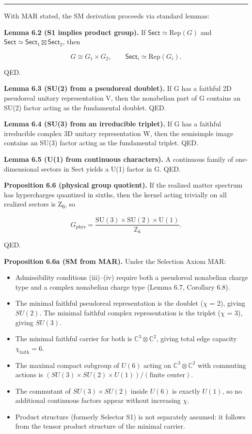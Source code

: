 \documentclass[11pt,a4paper]{article}
\theoremstyle{remark}
\providecommand{\tightlist}{%
  \setlength{\itemsep}{0pt}\setlength{\parskip}{0pt}}
\begin{document}
\begin{center}\rule{0.5\linewidth}{0.5pt}\end{center}

With MAR stated, the SM derivation proceeds via standard lemmas:

\textbf{Lemma 6.2 (S1 implies product group).} If
\(\mathsf{Sect} \simeq \mathrm{Rep}(G)\) and
\(\mathsf{Sect} \simeq \mathsf{Sect}_1 \boxtimes \mathsf{Sect}_2\),
then

\[
G \cong G_1 \times G_2,
\qquad
\mathsf{Sect}_i \simeq \mathrm{Rep}(G_i).
\]

QED.

\textbf{Lemma 6.3 (SU(2) from a pseudoreal doublet).} If G has a faithful
2D pseudoreal unitary representation V, then the nonabelian part of G
contains an SU(2) factor acting as the fundamental doublet. QED.

\textbf{Lemma 6.4 (SU(3) from an irreducible triplet).} If G has a faithful
irreducible complex 3D unitary representation W, then the semisimple image
contains an SU(3) factor acting as the fundamental triplet. QED.

\textbf{Lemma 6.5 (U(1) from continuous characters).} A continuous family of
one-dimensional sectors in Sect yields a U(1) factor in G. QED.

\textbf{Proposition 6.6 (physical group quotient).} If the realized matter
spectrum has hypercharges quantized in sixths, then the kernel acting
trivially on all realized sectors is Z\textsubscript{6}, so

\[
G_{\mathrm{phys}} = \frac{\mathrm{SU}(3)\times \mathrm{SU}(2)\times \mathrm{U}(1)}{\mathbb Z_6}.
\]

QED.

\textbf{Proposition 6.6a (SM from MAR).} Under the Selection Axiom MAR:

\begin{itemize}
\tightlist
\item
  Admissibility conditions (iii)--(iv) require both a pseudoreal nonabelian
  charge type and a complex nonabelian charge type (Lemma 6.7, Corollary 6.8).
\item
  The minimal faithful pseudoreal representation is the doublet (\ensuremath{\chi} = 2),
  giving \(SU(2)\). The minimal faithful complex representation is the triplet
  (\ensuremath{\chi} = 3), giving \(SU(3)\).
\item
  The minimal faithful carrier for both is \(\mathbb{C}^3 \otimes \mathbb{C}^2\),
  giving total edge capacity \(\chi_{\mathrm{faith}} = 6\).
\item
  The maximal compact subgroup of \(U(6)\) acting on
  \(\mathbb{C}^3 \otimes \mathbb{C}^2\) with commuting actions is
  \((SU(3) \times SU(2) \times U(1))/(\text{finite center})\).
\item
  The commutant of \(SU(3) \times SU(2)\) inside \(U(6)\) is exactly \(U(1)\),
  so no additional continuous factors appear without increasing \(\chi\).
\item
  Product structure (formerly Selector S1) is not separately assumed: it
  follows from the tensor product structure of the minimal carrier.
\end{itemize}
\end{document}
